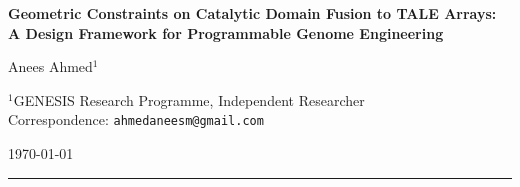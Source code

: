 \documentclass[11pt,a4paper]{article}
\begin{document}
\begin{center}
{\Large \textbf{Geometric Constraints on Catalytic Domain Fusion to TALE Arrays:\\
A Design Framework for Programmable Genome Engineering}}

\vspace{1em}
{\large Anees Ahmed$^{1}$}

\vspace{0.5em}
{\small
$^{1}$GENESIS Research Programme, Independent Researcher\\[0.3em]
Correspondence: \texttt{ahmedaneesm@gmail.com}
}

\vspace{0.5em}
{\small \today}
\end{center}

\vspace{0.5em}
\noindent\rule{\linewidth}{0.4pt}
\end{document}
